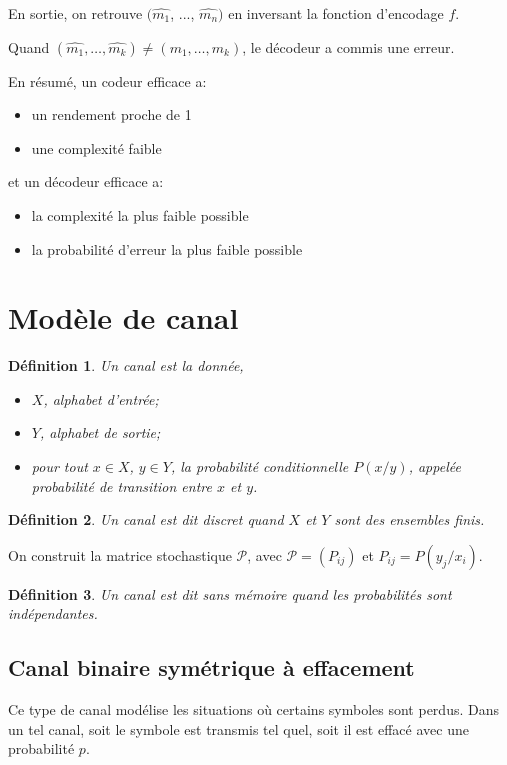 \documentclass[a4paper,10pt,twocolumn]{article}
\theoremstyle{break}
\newtheorem{mydef}{Définition}
\begin{document}
En sortie, on retrouve $(\hat{m_1}$, ..., $\hat{m_n})$ en inversant la fonction d'encodage $f$.

Quand $(\hat{m_1}, \ldots, \hat{m_k}) \ne (m_1, \ldots, m_k)$, le décodeur a commis une erreur.

En résumé, un codeur efficace a:
\begin{itemize}
 \item un rendement proche de 1
 \item une complexité faible
\end{itemize}

et un décodeur efficace a:
\begin{itemize}
 \item la complexité la plus faible possible
 \item la probabilité d'erreur la plus faible possible
\end{itemize}

\section{Modèle de canal}
\begin{mydef}
 Un canal est la donnée,
 \begin{itemize}
  \item $X$, alphabet d'entrée;
  \item $Y$, alphabet de sortie;
  \item pour tout $x \in X$, $y \in Y$, la probabilité conditionnelle $P(x/y)$, appelée probabilité de transition entre $x$ et $y$.
 \end{itemize}

\end{mydef}

\begin{mydef}
 Un canal est dit discret quand $X$ et $Y$ sont des ensembles finis.
\end{mydef}

On construit la matrice stochastique $\mathcal{P}$, avec $ \mathcal{P} = (P_{ij}) $ et $P_{ij} = P(y_j/x_i)$.

\begin{mydef}
 Un canal est dit sans mémoire quand les probabilités sont indépendantes.
\end{mydef}

\subsection{Canal binaire symétrique à effacement}
Ce type de canal modélise les situations où certains symboles sont perdus.
Dans un tel canal, soit le symbole est transmis tel quel, soit il est effacé avec une probabilité $p$.
\end{document}
